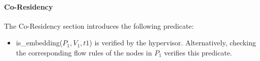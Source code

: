 
 
 
\paragraph{Co-Residency}
The Co-Residency section introduces the following predicate:

\begin{itemize}
    \item is\_embedding($P_1,V_1,t1$) is verified by the hypervisor. Alternatively, checking the corresponding flow rules of the nodes in $P_1$ verifies this predicate.
\end{itemize}